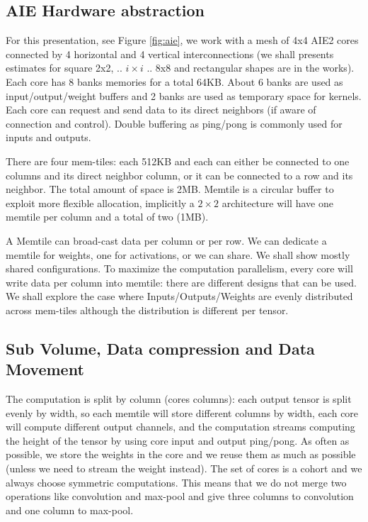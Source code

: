\documentclass[sigconf]{acmart}
\begin{document}
\subsection{AIE Hardware abstraction}


For this presentation, see Figure \ref{fig:aie}, we work with a mesh
of 4x4 AIE2 cores connected by 4 horizontal and 4 vertical
interconnections (we shall presents estimates for square 2x2,
.. $i\times i$ .. 8x8 and rectangular shapes are in the works). Each
core has 8 banks memories for a total 64KB. About 6 banks are used as
input/output/weight buffers and 2 banks are used as temporary space
for kernels. Each core can request and send data to its direct
neighbors (if aware of connection and control). Double buffering as
ping/pong is commonly used for inputs and outputs.

There are four mem-tiles: each 512KB and each can either be connected
to one columns and its direct neighbor column, or it can be connected
to a row and its neighbor. The total amount of space is 2MB. Memtile
is a circular buffer to exploit more flexible allocation, implicitly a
$2 \times 2$ architecture will have one memtile per column and a total
of two (1MB).

A Memtile can broad-cast data per column or per row. We can dedicate a
memtile for weights, one for activations, or we can share. We shall
show mostly shared configurations. To maximize the computation
parallelism, every core will write data per column into memtile: there
are different designs that can be used. We shall explore the case
where Inputs/Outputs/Weights are evenly distributed across mem-tiles
although the distribution is different per tensor.
\begin{comment}
The DDR is connected with two channels to write into each mem-tile and
each mem-tile can use two channels to write into DDR. DDR and Mem-tile
communications are parallel.  The abstraction can be extended to more
complex connections (from $1\times 1$, $8\times 2$, to $8\times 8$ and
more rows of memtiles designed for larger chips). But $4\times 4$ is
representative for the AIE engines you will find in the next
generation of CPU+FPGA chips.
\end{comment}

\subsection{Sub Volume, Data compression and Data Movement}
The computation is split by column (cores columns): each output tensor
is split evenly by width, so each memtile will store different columns
by width, each core will compute different output channels, and the
computation streams computing the height of the tensor by using core
input and output ping/pong. As often as possible, we store the weights
in the core and we reuse them as much as possible (unless we need to
stream the weight instead). The set of cores is a cohort and we always
choose symmetric computations. This means that we do not merge two
operations like convolution and max-pool and give three columns to
convolution and one column to max-pool.
\end{document}
